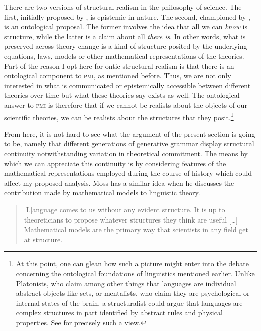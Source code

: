 \documentclass[output=paper]{langscibook}
\begin{document}
There are two versions of structural realism in the philosophy of science. The first, initially proposed by \cite{Worall1989}, is epistemic in nature. The second, championed by \cite{French2003}, is an ontological proposal. The former involves the idea that all we can \emph{know} is structure, while the latter is a claim about all \emph{there is}. In other words, what is preserved across theory change is a kind of structure posited by the underlying equations, laws, models or other mathematical representations of the theories. Part of the reason I opt here for ontic structural realism is that there is an ontological component to \textsc{pmi}, as mentioned before. Thus, we are not only interested in what is communicated or epistemically accessible between different theories over time but what these theories say exists as well. The ontological answer to \textsc{pmi} is therefore that if we cannot be realists about the objects of our scientific theories, we can be realists about the structures that they posit.\footnote{At this point, one can glean how such a picture might enter into the debate concerning the ontological foundations of linguistics mentioned earlier. Unlike Platonists, who claim among other things that languages are individual abstract objects like sets, or mentalists, who claim they are psychological or internal states of the brain, a structuralist could argue that languages are complex structures in part identified by abstract rules and physical properties. See \cite{Nefdt:2018} for precisely such a view.}  

From here, it is not hard to see what the argument of the present section is going to be, namely that different generations of generative grammar display structural continuity notwithstanding variation in theoretical commitment. The means by which we can appreciate this continuity is by considering features of the mathematical representations employed during the course of history which could affect my proposed analysis. Moss has a similar idea when he discusses the contribution made by mathematical models to linguistic theory. 

\begin{quote}
[L]anguage comes to us without any evident structure. It is up to theoreticians to propose whatever structures they think are useful […] Mathematical models are the primary way that scientists in any field get at structure. \citep[534]{Moss2012}
\end{quote}
\end{document}
